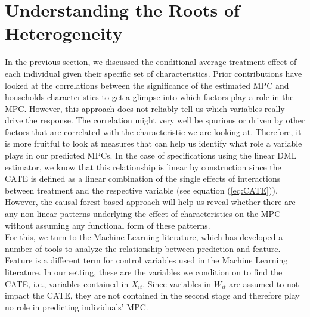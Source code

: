 \section{Understanding the Roots of Heterogeneity} \label{sec:roots_of_heterogeneity}
In the previous section, we discussed the conditional average treatment effect of each individual given their specific set of characteristics. Prior contributions have looked at the correlations between the significance of the estimated MPC and households characteristics to get a glimpse into which factors play a role in the MPC. However, this approach does not reliably tell us which variables really drive the response. The correlation might very well be spurious or driven by other factors that are correlated with the characteristic we are looking at. Therefore, it is more fruitful to look at measures that can help us identify what role a variable plays in our predicted MPCs. In the case of specifications using the linear DML estimator, we know that this relationship is linear by construction since the CATE is defined as a linear combination of the single effects of interactions between treatment and the respective variable (see equation (\ref{eq:CATE})). However, the causal forest-based approach will help us reveal whether there are any non-linear patterns underlying the effect of characteristics on the MPC without assuming any functional form of these patterns. \\
For this, we turn to the Machine Learning literature, which has developed a number of tools to analyze the relationship between prediction and feature. Feature is a different term for control variables used in the Machine Learning literature. In our setting, these are the variables we condition on to find the CATE, i.e., variables contained in $X_{it}$. Since variables in $W_{it}$ are assumed to not impact the CATE, they are not contained in the second stage and therefore play no role in predicting individuals' MPC.

